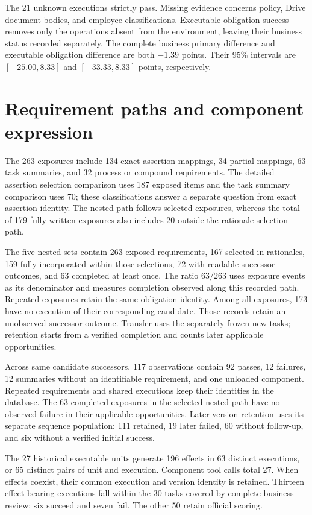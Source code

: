 \documentclass{ecai}
\begin{document}
The 21 unknown executions strictly pass. Missing evidence concerns policy, Drive document bodies, and employee classifications. Executable obligation success removes only the operations absent from the environment, leaving their business status recorded separately. The complete business primary difference and executable obligation difference are both $-1.39$ points. Their 95\% intervals are $[-25.00,8.33]$ and $[-33.33,8.33]$ points, respectively.

\section{Requirement paths and component expression}

The 263 exposures include 134 exact assertion mappings, 34 partial mappings, 63 task summaries, and 32 process or compound requirements. The detailed assertion selection comparison uses 187 exposed items and the task summary comparison uses 70; these classifications answer a separate question from exact assertion identity. The nested path follows selected exposures, whereas the total of 179 fully written exposures also includes 20 outside the rationale selection path.

The five nested sets contain 263 exposed requirements, 167 selected in rationales, 159 fully incorporated within those selections, 72 with readable successor outcomes, and 63 completed at least once. The ratio $63/263$ uses exposure events as its denominator and measures completion observed along this recorded path. Repeated exposures retain the same obligation identity. Among all exposures, 173 have no execution of their corresponding candidate. Those records retain an unobserved successor outcome. Transfer uses the separately frozen new tasks; retention starts from a verified completion and counts later applicable opportunities.

Across same candidate successors, 117 observations contain 92 passes, 12 failures, 12 summaries without an identifiable requirement, and one unloaded component. Repeated requirements and shared executions keep their identities in the database. The 63 completed exposures in the selected nested path have no observed failure in their applicable opportunities. Later version retention uses its separate sequence population: 111 retained, 19 later failed, 60 without follow-up, and six without a verified initial success.

The 27 historical executable units generate 196 effects in 63 distinct executions, or 65 distinct pairs of unit and execution. Component tool calls total 27. When effects coexist, their common execution and version identity is retained. Thirteen effect-bearing executions fall within the 30 tasks covered by complete business review; six succeed and seven fail. The other 50 retain official scoring.
\end{document}
